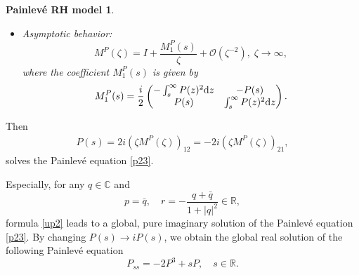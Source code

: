 \documentclass[11pt]{article}
\numberwithin{equation}{section}
\newtheorem{painleve}{Painlev\'e RH model}
\begin{document}
\begin{appendices}
\begin{painleve}
\begin{itemize}
 		\item Asymptotic behavior:
       \begin{equation}\label{stanp}
 M^P(\zeta) = I +\frac{M_1^P(s)}{\zeta} + \mathcal{O} \left(\zeta^{-2}\right), \; \zeta\to \infty,
 \end{equation}
 where the  coefficient $M_1^P(s)$ is given by
 \begin{align}\label{posee}
 M_1^P(s) = \frac{{ i} }{2} \begin{pmatrix} -\int_{s}^\infty P(z)^2 {\rm d } z & - P(s)  \\ P(s) &  \int_{s}^\infty P(z)^2 {\rm d } z \end{pmatrix}.
 \end{align}
 	\end{itemize}
 \end{painleve}
Then
 \begin{align}\label{up2}
 P(s)=2{ i} \left(\zeta M^{P}(\zeta)\right)_{12} = -2 { i} \left(\zeta M^{P}(\zeta)\right)_{21},
 \end{align}
 solves  the Painlev\'{e} \uppercase\expandafter{} equation \eqref{p23}.

 Especially, for any $q \in \mathbb{C}$ and
 \begin{equation*}
  p=\bar{q}, \quad r = -\frac{q+\bar{q}}{1+|q|^2} \in \mathbb{R},
 \end{equation*}
 formula \eqref{up2} leads to a global, pure imaginary solution of the Painlev\'{e} \uppercase\expandafter{}  equation \eqref{p23}. By changing
 $P(s)\to i P(s)$, we obtain  the global real  solution of the following  Painlev\'{e} \uppercase\expandafter{}  equation
 \begin{equation}\label{p235}
 	P_{ss} =-2 P^3 +s P, \quad s \in \mathbb{R}.
\end{equation}










\end{appendices}
\vspace{10mm}
\end{document}
